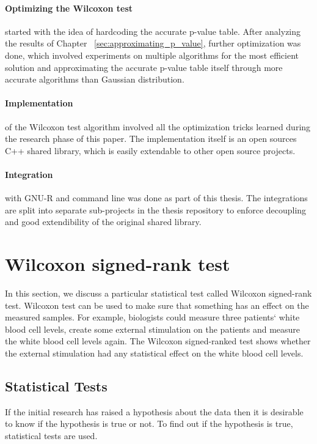 \documentclass[12pt]{article}
\begin{document}
{\paragraph{Optimizing the Wilcoxon test} started with the idea of hardcoding the accurate p-value table. After analyzing the results of Chapter ~\ref{sec:approximating_p_value}, further optimization was done, which involved experiments on multiple algorithms for the most efficient solution and approximating the accurate p-value table itself through more accurate algorithms than Gaussian distribution.

\paragraph{Implementation} of the Wilcoxon test algorithm involved all the optimization tricks learned during the research phase of this paper. The implementation itself is an open sources C++ shared library, which is easily extendable to other open source projects.

\paragraph{Integration} with GNU-R and command line was done as part of this thesis. The integrations are split into separate sub-projects in the thesis repository to enforce decoupling and good extendibility of the original shared library.

\newpage

\section{Wilcoxon signed-rank test}

In this section, we discuss a particular statistical test called Wilcoxon signed-rank test. Wilcoxon test can be used to make sure that something has an effect on the measured samples. For example, biologists could measure three patients` white blood cell levels, create some external stimulation on the patients and measure the white blood cell levels again. The Wilcoxon signed-ranked test shows whether the external stimulation had any statistical effect on the white blood cell levels.
\subsection{Statistical Tests}

If the initial research has raised a hypothesis about the data then it is desirable to know if the hypothesis is true or not. To find out if the hypothesis is true, statistical tests are used.

}
\end{document}
